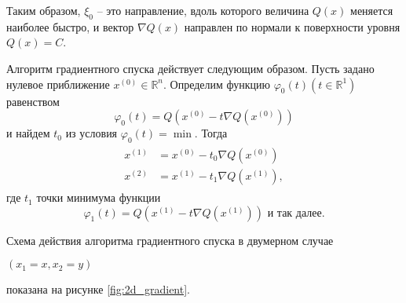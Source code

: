Таким образом, $\xi_0$ -- это направление, вдоль которого величина $Q(x)$ меняется наиболее быстро, и вектор $\nabla Q(x)$ направлен по нормали к поверхности уровня $Q(x) = C$.

Алгоритм градиентного спуска действует следующим образом. Пусть задано нулевое приближение $x^{(0)} \in \mathbb{R}^n$. Определим функцию $\varphi_0(t) (t \in \mathbb{R}^1)$ равенством
\begin{equation} \label{eq:8.7}
	\varphi_0(t) = Q(x^{(0)} - t\nabla Q(x^{(0)})) 
\end{equation}
и найдем $t_0$ из условия $\varphi_0(t) = \min$. Тогда
\begin{align}
	\begin{split} \label{eq:8.8}
		x^{(1)} &= x^{(0)} - t_0\nabla Q(x^{(0)}) \\
		x^{(2)} &= x^{(1)} - t_1\nabla Q(x^{(1)}),
	\end{split}
\end{align}
где $t_1$ точки минимума функции
\begin{equation} \label{eq:8.9}
	\varphi_1(t) = Q(x^{(1)} - t\nabla Q(x^{(1)})) \textrm{ и так далее}.
\end{equation}

Схема действия алгоритма градиентного спуска в двумерном случае \parbox{29mm}{$(x_1 = x, x_2 = y)$} показана на рисунке \ref{fig:2d_gradient}.


